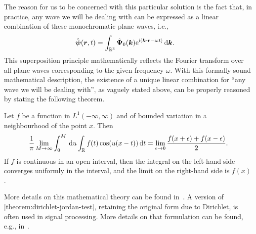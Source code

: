 \documentclass[11pt,a4paper,twoside,openany]{report}
\begin{document}
The reason for us to be concerned with this particular solution is the fact that, in practice, any wave we will be dealing with can be expressed as a linear combination of these monochromatic plane waves, i.e.,
\begin{align}
    \label{eq:fourier-transform}
    \hat{\boldsymbol\psi}(\boldsymbol r,t) &= \int_{{\mathbb R}^3} \hat{\boldsymbol{\Psi}}_0(\boldsymbol k)\mathrm e^{\mathrm i(\boldsymbol k \cdot \boldsymbol r - \omega t)}\, {\mathrm d}\boldsymbol k.
\end{align}
This superposition principle mathematically reflects the Fourier transform over all plane waves corresponding to the given frequency $\omega$. With this formally sound mathematical description, the existence of a unique linear combination for \enquote{any wave we will be dealing with}, as vaguely stated above, can be properly reasoned by stating the following theorem.
\begin{theorem}
    \label{theorem:dirichlet-jordan-test}
    Let $f$ be a function in $L^1(-\infty,\infty)$ and of bounded variation in a neighbourhood of the point $x$. Then
    \begin{align}
        \frac1\pi \lim_{M\to\infty}\int_0^M\,{\mathrm d} u \int_{\mathbb R} f(t)\cos(u(x-t))\,{\mathrm d} t = \lim_{\epsilon\to0}\frac{f(x+\epsilon)+f(x-\epsilon)}2.
    \end{align}
    If $f$ is continuous in an open interval, then the integral on the left-hand side converges uniformly in the interval, and the limit on the right-hand side is $f(x)$.
\end{theorem}
More details on this mathematical theory can be found in~\parencite{titchmarsh:introduction-to-the-theory-of-fourier-integrals}. A version of \cref{theorem:dirichlet-jordan-test}, retaining the original form due to Dirichlet, is often used in signal processing. More details on that formulation can be found, e.g., in~\parencite{oppenheim:signals-and-systems}.
\end{document}
